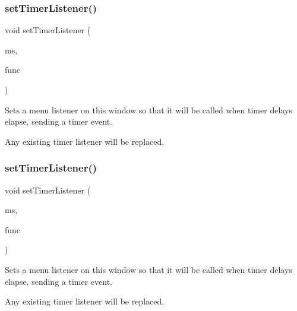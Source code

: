 \subsubsection{\texorpdfstring{set\+Timer\+Listener()}{setTimerListener()}\hspace{0.1cm}{\footnotesize\ttfamily [1/2]}}
{\footnotesize\ttfamily void set\+Timer\+Listener (\begin{DoxyParamCaption}\item[{double}]{ms,  }\item[{\mbox{\hyperlink{namespacesgl_ae9f3e9eab70035da1a2b114e21357b25}{G\+Event\+Listener}}}]{func }\end{DoxyParamCaption})\hspace{0.3cm}{\ttfamily [virtual]}}



Sets a menu listener on this window so that it will be called when timer delays elapse, sending a timer event. 

Any existing timer listener will be replaced. \mbox{\label{classsgl_1_1GWindow_ae23e03c86580bbcefc2dee4d01d08091}} 
\subsubsection{\texorpdfstring{set\+Timer\+Listener()}{setTimerListener()}\hspace{0.1cm}{\footnotesize\ttfamily [2/2]}}
{\footnotesize\ttfamily void set\+Timer\+Listener (\begin{DoxyParamCaption}\item[{double}]{ms,  }\item[{\mbox{\hyperlink{namespacesgl_a54427ce97bb1c2804e4fe2b0a62e8b17}{G\+Event\+Listener\+Void}}}]{func }\end{DoxyParamCaption})\hspace{0.3cm}{\ttfamily [virtual]}}



Sets a menu listener on this window so that it will be called when timer delays elapse, sending a timer event. 

Any existing timer listener will be replaced. \mbox{\label{classsgl_1_1GWindow_abc79cf0667bbb5c93fca3f01b52c7b57}} 
